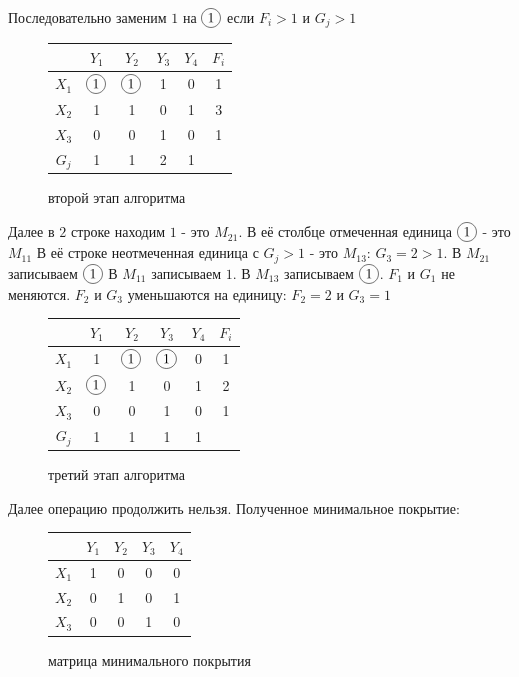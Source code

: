 \documentclass[12pt]{article}
\newcommand*\circled[1]{\tikz[baseline=(char.base)]{
            \node[shape=circle,draw,inner sep=2pt] (char) {#1};}}
\begin{document}
Последовательно заменим $1$ на $\circled{1}$ если $F_i > 1$ и $G_j > 1$

\begin{figure}[H]
    \centering
    \begin{tabular}{ c|c|c|c|c|c }
              & $Y_1$         & $Y_2$         & $Y_3$ & $Y_4$ & $F_i$ \\
        \hline
        $X_1$ & $\circled{1}$ & $\circled{1}$ & 1     & 0     & 1     \\
        \hline
        $X_2$ & 1             & 1             & 0     & 1     & 3     \\
        \hline
        $X_3$ & 0             & 0             & 1     & 0     & 1     \\
        \hline
        $G_j$ & 1             & 1             & 2     & 1     &
    \end{tabular}
    \label{fig:second_step_complete}
    \caption{второй этап алгоритма}
\end{figure}

Далее в $2$ строке находим $1$ - это $M_{21}$. В её
столбце отмеченная единица $\circled{1}$ - это $M_{11}$
В её строке неотмеченная единица с $G_j > 1$ - это $M_{13}$:
$G_3 = 2 > 1$. В $M_{21}$ записываем $\circled{1}$ В $M_{11}$
записываем $1$. В $M_{13}$ записываем $\circled{1}$.
$F_1$ и $G_1$ не меняются. $F_2$ и $G_3$ уменьшаются на единицу:
$F_2 = 2$ и $G_3 = 1$

\begin{figure}[H]
    \centering
    \begin{tabular}{ c|c|c|c|c|c }
              & $Y_1$         & $Y_2$         & $Y_3$         & $Y_4$ & $F_i$ \\
        \hline
        $X_1$ & 1             & $\circled{1}$ & $\circled{1}$ & 0     & 1     \\
        \hline
        $X_2$ & $\circled{1}$ & 1             & 0             & 1     & 2     \\
        \hline
        $X_3$ & 0             & 0             & 1             & 0     & 1     \\
        \hline
        $G_j$ & 1             & 1             & 1             & 1     &
    \end{tabular}
    \label{fig:third_step_complete}
    \caption{третий этап алгоритма}
\end{figure}

Далее операцию продолжить нельзя. Полученное минимальное покрытие:

\begin{figure}[H]
    \centering
    \begin{tabular}{ c|c|c|c|c| }
              & $Y_1$ & $Y_2$ & $Y_3$ & $Y_4$ \\
        \hline
        $X_1$ & 1     & 0     & 0     & 0     \\
        \hline
        $X_2$ & 0     & 1     & 0     & 1     \\
        \hline
        $X_3$ & 0     & 0     & 1     & 0     \\
        \hline
    \end{tabular}
    \label{fig:finished_coverage}
    \caption{матрица минимального покрытия}
\end{figure}
\end{document}
